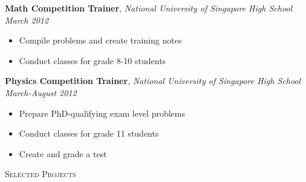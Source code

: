 \documentclass[9pt]{article}
\newenvironment{changemargin}[2]{%
  \begin{list}{}{%
      \setlength{\topsep}{0pt}%
      \setlength{\leftmargin}{#1}%
      \setlength{\rightmargin}{#2}%
      \setlength{\listparindent}{\parindent}%
      \setlength{\itemindent}{\parindent}%
      \setlength{\parsep}{\parskip}%
    }%
  \item[]}{\end{list}
}
\newcommand{\lineover}{
  \begin{changemargin}{-0.05in}{-0.05in}
    \vspace*{-8pt}
    \hrulefill \\
    \vspace*{-2pt}
  \end{changemargin}
}
\newcommand{\header}[1]{
  \begin{changemargin}{-0.5in}{-0.5in}
    \scshape{#1}\\
    \lineover
  \end{changemargin}
}
\newenvironment{body} {
  \vspace*{-16pt}
  \begin{changemargin}{-0.25in}{-0.5in}
  }
  {\end{changemargin}
}
\begin{document}
\begin{body}

  \textbf{Math Competition Trainer}, \emph{National University of Singapore High School} \hfill \emph{March 2012}\\
  \vspace*{-4pt}
  \begin{itemize} \itemsep -0pt  %
  \item Compile problems and create training notes
  \item Conduct classes for grade 8-10 students
  \end{itemize}

  \textbf{Physics Competition Trainer}, \emph{National University of Singapore High School} \hfill \emph{March-August 2012}\\
  \vspace*{-4pt}
  \begin{itemize} \itemsep -0pt  %
  \item Prepare PhD-qualifying exam level problems
  \item Conduct classes for grade 11 students
  \item Create and grade a test
  \end{itemize}
\end{body}

\smallskip

\header{Selected Projects}
\end{document}
